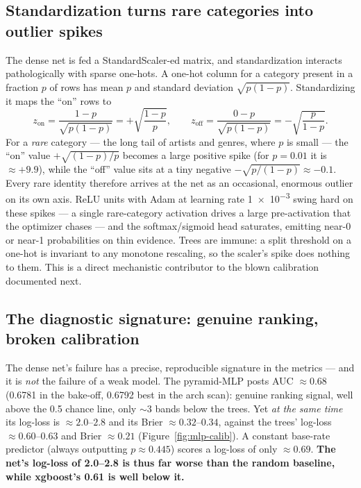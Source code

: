 \documentclass[11pt]{article}
\begin{document}
\subsection{Standardization turns rare categories into outlier spikes}
\label{sec:anns-scaler}
The dense net is fed a StandardScaler-ed matrix, and standardization interacts
pathologically with sparse one-hots. A one-hot column for a category present in
a fraction $p$ of rows has mean $p$ and standard deviation $\sqrt{p(1-p)}$.
Standardizing it maps the ``on'' rows to
\[
  z_{\text{on}} = \frac{1-p}{\sqrt{p(1-p)}} = +\sqrt{\frac{1-p}{p}},
  \qquad
  z_{\text{off}} = \frac{0-p}{\sqrt{p(1-p)}} = -\sqrt{\frac{p}{1-p}}.
\]
For a \emph{rare} category --- the long tail of artists and genres, where $p$ is
small --- the ``on'' value $+\sqrt{(1-p)/p}$ becomes a large positive spike (for
$p=0.01$ it is $\approx +9.9$), while the ``off'' value sits at a tiny negative
$-\sqrt{p/(1-p)}\approx -0.1$. Every rare identity therefore arrives at the net
as an occasional, enormous outlier on its own axis. ReLU units with Adam at
learning rate \num{1e-3} swing hard on these spikes --- a single rare-category
activation drives a large pre-activation that the optimizer chases --- and the
softmax/sigmoid head saturates, emitting near-0 or near-1 probabilities on thin
evidence. Trees are immune: a split threshold on a one-hot is invariant to any
monotone rescaling, so the scaler's spike does nothing to them. This is a direct
mechanistic contributor to the blown calibration documented next.

\subsection{The diagnostic signature: genuine ranking, broken calibration}
\label{sec:anns-signature}
The dense net's failure has a precise, reproducible signature in the metrics ---
and it is \emph{not} the failure of a weak model. The pyramid-MLP posts AUC
$\approx 0.68$ (0.6781 in the bake-off, 0.6792 best in the arch scan): genuine
ranking signal, well above the 0.5 chance line, only $\sim$3 bands below the
trees. Yet \emph{at the same time} its log-loss is $\approx 2.0$--$2.8$ and its
Brier $\approx 0.32$--$0.34$, against the trees' log-loss $\approx 0.60$--$0.63$
and Brier $\approx 0.21$ (Figure~\ref{fig:mlp-calib}). A constant base-rate
predictor (always outputting $p\approx 0.445$) scores a log-loss of only
$\approx 0.69$. \textbf{The net's log-loss of 2.0--2.8 is thus far worse than the
random baseline, while xgboost's 0.61 is well below it.}
\end{document}
